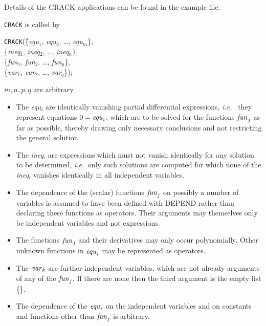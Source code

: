 
Details of the CRACK applications can be found in the example file.

{\tt CRACK} is called by
\begin{tabbing}
  {\tt CRACK}(\=\{{\it equ}$_1$, {\it equ}$_2$, \ldots , {\it equ}$_m$\},  \\
              \>\{{\it ineq}$_1$, {\it ineq}$_2$, \ldots , {\it ineq}$_n$\}, \\
              \>\{{\it fun}$_1$, {\it fun}$_2$, \ldots , {\it fun}$_p$\},  \\
              \>\{{\it var}$_1$, {\it var}$_2$, \ldots , {\it var}$_q$\});
\end{tabbing}
        $m,n,p,q$ are arbitrary.
\begin{itemize}
\item
The {\it equ}$_i$ are identically vanishing partial differential expressions, 
{\em i.e.\ }
they represent equations  $0 = {\it equ}_i$, which are to be solved for the 
functions ${\it fun}_j$ as far as possible, thereby drawing only necessary
conclusions and not restricting the general solution.
\item
The {\it ineq}$_i$ are expressions which must not vanish identically for
any solution to be determined, {\em i.e.\ }only such solutions are
computed for which none of the {\it ineq}$_i$ vanishes identically in
all independent variables. 
\item
The dependence of the (scalar) functions ${\it fun}_j$ on possibly a
number of variables is assumed to have been defined with DEPEND rather
than declaring these functions as operators.  Their arguments may
themselves only be independent variables and not expressions.
\item
The functions ${\it fun}_j$ and their derivatives may only occur
polynomially.  Other unknown functions in ${\it equ}_i$ may be
represented as operators. 
\item
The ${\it var}_k$ are further independent variables, which are not
already arguments of any of the ${\it fun}_j$.  If there are none then
the third argument is the empty list \{\}.
\item 
The dependence of the ${\it equ}_i$ on the independent variables and on
constants and functions other than ${\it fun}_j$ is arbitrary.
\end{itemize}

